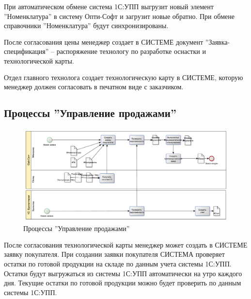 При автоматическом обмене система 1С:УПП выгрузит новый элемент ''Номенклатура'' в систему Опти-Софт и загрузит новые обратно. При обмене справочники ''Номенклатура'' будут синхронизированы. 


После согласования цены менеджер создает в СИСТЕМЕ документ ''Заявка-спецификация'' -- распоряжение технологу по разработке оснастки и технологической карты. 

Отдел главного технолога создает технологическую карту в СИСТЕМЕ, которую менеджер должен согласовать в печатном виде с заказчиком. 



\subsection{Процессы ''Управление продажами''}
\begin{figure}
\begin{center}
  \includegraphics[angle=90, height=0.9\textheight, keepaspectratio]{Pics/2_Продажи.pdf}
\end{center}
  \caption{Процессы ''Управление продажами''}
  \label{pic:Schema_2}
\end{figure}
\clearpage




После согласования технологической карты менеджер может создать в СИСТЕМЕ заявку покупателя. При создании заявки покупателя СИСТЕМА проверяет остатки по готовой продукции на складе по данным учета системы 1С:УПП. Остатки будут выгружаться из системы 1С:УПП автоматически на утро каждого дня. Текущие остатки по готовой продукции можно будет проверить по данным системы 1С:УПП.

